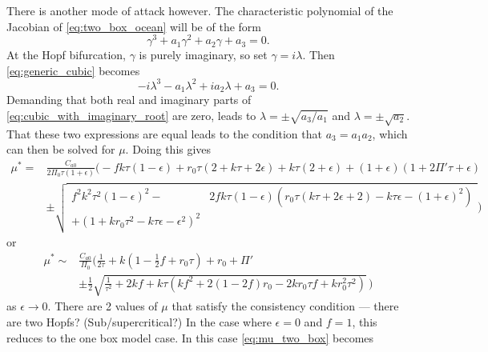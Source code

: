 There is another mode of attack however. The characteristic polynomial of the Jacobian of \cref{eq:two_box_ocean} will be of the form
\begin{equation}
  \label{eq:generic_cubic}
  \gamma^3 + a_1 \gamma^2 + a_2 \gamma + a_3 = 0.
\end{equation}
At the Hopf bifurcation, $\gamma$ is purely imaginary, so set $\gamma = i\lambda$. Then \cref{eq:generic_cubic} becomes
\begin{equation}
  \label{eq:cubic_with_imaginary_root}
  -i\lambda^3 - a_1 \lambda^2 + i a_2 \lambda + a_3 = 0. 
\end{equation}
Demanding that both real and imaginary parts of \cref{eq:cubic_with_imaginary_root} are zero, leads to $\lambda = \pm \sqrt{a_3/a_1}$ and $\lambda = \pm \sqrt{a_2}$. That these two expressions
are equal leads to the condition that $a_3 = a_1a_2$, which can then be solved for $\mu$. Doing this gives
\begin{equation}
  \label{eq:mu_two_box}
  \begin{split}
  \mu^* = &\frac{C_{a0}}{2 \Pi_0 \tau  (1+\epsilon)}
  \Biggl(
  -f k \tau  (1-\epsilon)+r_0 \tau  (2 + k \tau +2 \epsilon)+k \tau  (2+\epsilon)+(1+\epsilon) (1+2 \Pi' \tau +\epsilon)\\
  &\pm\sqrt{
    \begin{split}
    f^2 k^2 \tau ^2 (1-\epsilon)^2-&2 f k \tau  (1-\epsilon) \left(r_0 \tau  (k \tau +2 \epsilon +2)-k \tau  \epsilon -(1+\epsilon)^2\right)\\+
    \left(1+k r_0 \tau ^2-k \tau  \epsilon -\epsilon ^2\right)^2
  \end{split}}
  \Biggr)
  \end{split}
\end{equation}
or
\begin{equation}
  \label{eq:mu_two_box_zero_eps}
  \begin{split}
  \mu^* \sim &\frac{C_{a0}}{\Pi_0}\Biggl(
    \frac{1}{2\tau} + k(1 - \frac{1}{2}f + r_0 \tau) + r_0 + \Pi'\\
  &\pm\frac{1}{2}\sqrt{\frac{1}{\tau^2} + 2kf + k\tau(kf^2 + 2 (1 - 2f)r_0  - 2 k r_0\tau f  + k r_0^2 \tau^2)}\,\Biggr)
\end{split}
\end{equation}
as $\epsilon \rightarrow 0$.
There are 2 values of $\mu$ that satisfy the consistency condition --- there are two Hopfs? (Sub/supercritical?)
In the case where $\epsilon = 0$ and $f = 1$, this reduces to the one box model case. In this case \cref{eq:mu_two_box} becomes
